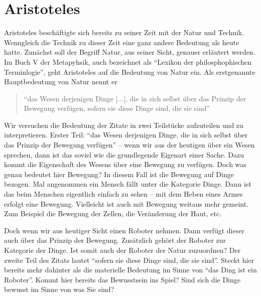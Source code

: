 \section{Aristoteles}
Aristoteles beschäftigte sich bereits zu seiner Zeit mit der Natur und Technik. Wenngleich die Technik zu dieser Zeit eine ganz andere Bedeutung als heute hatte. Zunächst soll der Begriff Natur, aus seiner Sicht, genauer erläutert werden. 
Im Buch V der Metapyhsik, auch bezeichnet als \enquote{Lexikon der philosphophischen Terminlogie}, geht Aristoteles auf die Bedeutung von Natur ein. Als erstgenannte Hauptbedeutung von Natur nennt er
\begin{quote}
	\enquote{das Wesen derjenigen Dinge [...], die in sich selbst über das Prinzip der Bewegung verfügen, sofern sie diese Dinge sind, die sie sind}
	\cite[1015a14 f.]{MetaphysikV} 
\end{quote}


Wir versuchen die Bedeutung der Zitate in zwei Teilstücke aufzuteilen und zu interpretieren. Erster Teil: \enquote{das Wesen derjenigen Dinge, die in sich selbst über das Prinzip der Bewegung verfügen} -- wenn wir aus der heutigen über ein Wesen sprechen, dann ist das soviel wie die grundlegende Eigenart einer Sache. Dazu kommt die Eigenschaft des Wesens über eine Bewegung zu verfügen. Doch was genau bedeutet hier Bewegung? In diesem Fall ist die Bewegung auf Dinge bezogen. Mal angenommen ein Mensch fällt unter die Kategorie Dinge. Dann ist das beim Menschen eigentlich einfach zu sehen -- mit dem Heben eines Armes erfolgt eine Bewegung. Vielleicht ist auch mit Bewegung weitaus mehr gemeint. Zum Beispiel die Bewegung der Zellen, die Veränderung der Haut, etc. 

Doch wenn wir aus heutiger Sicht einen Roboter nehmen. Dann verfügt dieser auch über das Prinzip der Bewegung. Zusätzlich gehört der Roboter zur Kategorie der Dinge. Ist somit auch der Roboter der Natur zuzuordnen? Der zweite Teil des Zitats lautet \enquote{sofern sie diese Dinge sind, die sie sind}. Steckt hier bereits mehr dahinter als die materielle Bedeutung im Sinne von \enquote{das Ding ist ein Roboter}. Kommt hier bereits das Bewusstsein ins Spiel? Sind sich die Dinge bewusst im Sinne von was Sie sind?  


